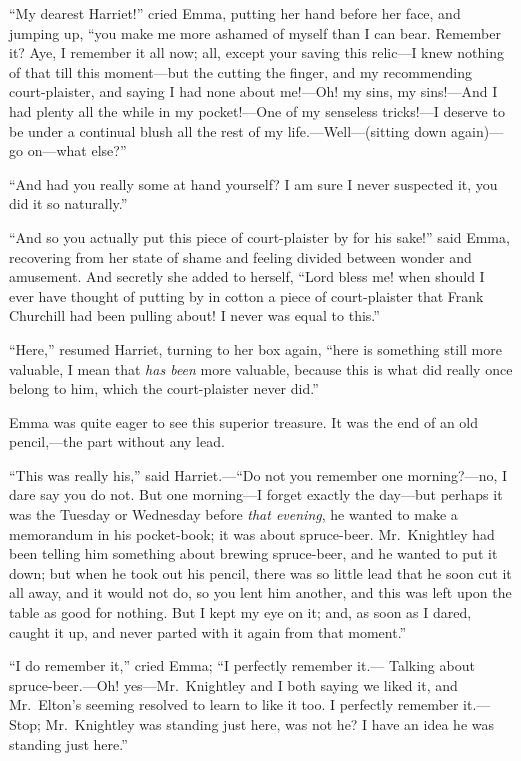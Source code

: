``My dearest Harriet!'' cried Emma, putting her hand before her face,
and jumping up, ``you make me more ashamed of myself than I can bear.
Remember it?  Aye, I remember it all now; all, except your saving
this relic---I knew nothing of that till this moment---but the cutting
the finger, and my recommending court-plaister, and saying I had none
about me!---Oh! my sins, my sins!---And I had plenty all the while in
my pocket!---One of my senseless tricks!---I deserve to be under a
continual blush all the rest of my life.---Well---(sitting down again)---%
go on---what else?''

``And had you really some at hand yourself?  I am sure I never
suspected it, you did it so naturally.''

``And so you actually put this piece of court-plaister by for his sake!''
said Emma, recovering from her state of shame and feeling divided
between wonder and amusement.  And secretly she added to herself,
``Lord bless me! when should I ever have thought of putting by in cotton
a piece of court-plaister that Frank Churchill had been pulling about!
I never was equal to this.''

``Here,'' resumed Harriet, turning to her box again, ``here is
something still more valuable, I mean that \emph{has been} more valuable,
because this is what did really once belong to him, which the
court-plaister never did.''

Emma was quite eager to see this superior treasure.  It was the end
of an old pencil,---the part without any lead.

``This was really his,'' said Harriet.---``Do not you remember
one morning?---no, I dare say you do not.  But one morning---I forget
exactly the day---but perhaps it was the Tuesday or Wednesday before
\emph{that evening}, he wanted to make a memorandum in his pocket-book;
it was about spruce-beer. Mr.\ Knightley had been telling him
something about brewing spruce-beer, and he wanted to put it down;
but when he took out his pencil, there was so little lead that he
soon cut it all away, and it would not do, so you lent him another,
and this was left upon the table as good for nothing.  But I kept
my eye on it; and, as soon as I dared, caught it up, and never
parted with it again from that moment.''

``I do remember it,'' cried Emma; ``I perfectly remember it.---%
Talking about spruce-beer.---Oh! yes---Mr.\ Knightley and I both saying we
liked it, and Mr.\ Elton's seeming resolved to learn to like it too.
I perfectly remember it.---Stop; Mr.\ Knightley was standing just here,
was not he?  I have an idea he was standing just here.''

